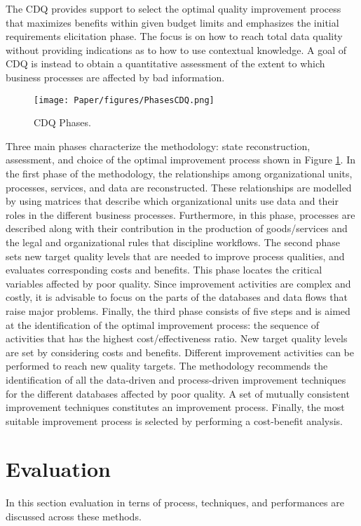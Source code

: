 \documentclass[pdftex,english,oribibl]{llncs}
\begin{document}
The CDQ provides support to select the optimal quality improvement process that maximizes benefits within given budget limits and emphasizes the initial requirements elicitation phase.
The focus is on how to reach total data quality without providing indications as to how to use contextual knowledge. A goal of CDQ is instead to obtain a quantitative assessment of the extent to which business processes are affected by bad information.

\begin{figure}
    \centering
    \texttt{[image: Paper/figures/PhasesCDQ.png]}
    \caption{CDQ Phases.}
    \label{fig:PhasesCDQ}
 \end{figure}

Three main phases characterize the methodology: state reconstruction, assessment, and choice of the optimal improvement process shown in Figure \ref{fig:PhasesCDQ}.
In the first phase of the methodology, the relationships among organizational units, processes, services, and data are reconstructed.
These relationships are modelled by using matrices that describe which organizational units use data and their roles in the different business processes.
Furthermore, in this phase, processes are described along with their contribution in the production of goods/services and the legal and organizational rules that discipline workflows.
The second phase sets new target quality levels that are needed to improve process qualities, and evaluates corresponding costs and benefits.
This phase locates the critical variables affected by poor quality. Since improvement activities are complex and costly, it is advisable to focus on the parts of the databases and data flows that raise major problems.
Finally, the third phase consists of five steps and is aimed at the identification of the optimal improvement process: the sequence of activities that has the highest cost/effectiveness ratio.
New target quality levels are set by considering costs and benefits. Different improvement activities can be performed to reach new quality targets.
The methodology recommends the identification of all the data-driven and process-driven improvement techniques for the different databases affected by poor quality.
A set of mutually consistent improvement techniques constitutes an improvement process.
Finally, the most suitable improvement process is selected by performing a cost-benefit analysis.


\section{Evaluation}
In this section evaluation in terns of process, techniques, and performances are discussed across these methods.
\end{document}
